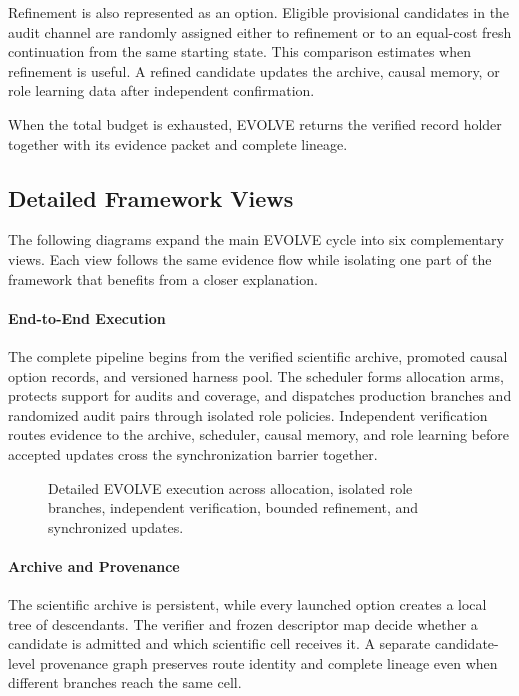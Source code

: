 Refinement is also represented as an option. Eligible provisional candidates in the audit channel are randomly assigned either to refinement or to an equal-cost fresh continuation from the same starting state. This comparison estimates when refinement is useful. A refined candidate updates the archive, causal memory, or role learning data after independent confirmation.

When the total budget is exhausted, EVOLVE returns the verified record holder together with its evidence packet and complete lineage.

\clearpage

\subsection{Detailed Framework Views}
\label{secdetailedviews}

The following diagrams expand the main EVOLVE cycle into six complementary views. Each view follows the same evidence flow while isolating one part of the framework that benefits from a closer explanation.

\paragraph{End-to-End Execution}
The complete pipeline begins from the verified scientific archive, promoted causal option records, and versioned harness pool. The scheduler forms allocation arms, protects support for audits and coverage, and dispatches production branches and randomized audit pairs through isolated role policies. Independent verification routes evidence to the archive, scheduler, causal memory, and role learning before accepted updates cross the synchronization barrier together.

\begin{figure}[!htbp]
\centering
\resizebox{\linewidth}{!}{}
\caption{Detailed EVOLVE execution across allocation, isolated role branches, independent verification, bounded refinement, and synchronized updates.}
\label{figdetailedpipeline}
\end{figure}

\clearpage

\paragraph{Archive and Provenance}
The scientific archive is persistent, while every launched option creates a local tree of descendants. The verifier and frozen descriptor map decide whether a candidate is admitted and which scientific cell receives it. A separate candidate-level provenance graph preserves route identity and complete lineage even when different branches reach the same cell.

